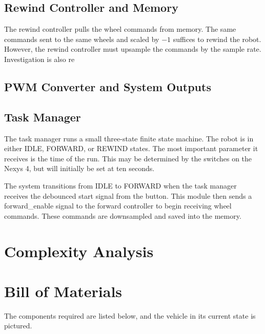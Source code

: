 \documentclass{article}
\begin{document}
\subsection*{Rewind Controller and Memory}
The rewind controller pulls the wheel commands from memory. The same commands sent to the same wheels and scaled by $-1$ suffices to rewind the robot. However, the rewind controller must upsample the commands by the sample rate. Investigation is also re
\subsection*{PWM Converter and System Outputs}
\subsection*{Task Manager} 
The task manager runs a small three-state finite state machine. The robot is in either IDLE, FORWARD, or REWIND states. The most important parameter it receives is the time of the run. This may be determined by the switches on the Nexys 4, but will initially be set at ten seconds.  

The system transitions from IDLE to FORWARD when the task manager receives the debounced start signal from the button. This module then sends a forward\_enable signal to the forward controller to begin receiving wheel commands. These commands are downsampled and saved into the memory. 

\section*{Complexity Analysis}

\section*{Bill of Materials}
The components required are listed below, and the vehicle in its current state is pictured. 
\end{document}
